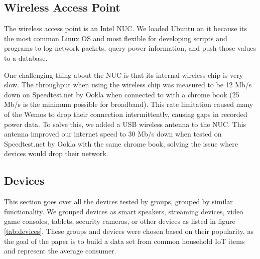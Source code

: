 \subsection{Wireless Access Point}
\label{Wireless Access Point}
The wireless access point is an Intel NUC. We loaded Ubuntu on it because its the most common Linux OS and most flexible for developing scripts and programs to log network packets, query power information, and push those values to a database.

One challenging thing about the NUC is that its internal wireless chip is very slow. The throughput when using the wireless chip was measured to be 12 Mb/s down on Speedtest.net by Ookla when connected to with a chrome book (25 Mb/s is the minimum possible for broadband). This rate limitation caused many of the Wemos to drop their connection intermittently, causing gaps in recorded power data. To solve this, we added a USB wireless antenna to the NUC. This antenna improved our internet speed to 30 Mb/s down when tested on Speedtest.net by Ookla with the same chrome book, solving the issue where devices would drop their network.

\subsection{Devices}
\label{Devices}
This section goes over all the devices tested by groups, grouped by similar functionality. We grouped devices as smart speakers, streaming devices, video game consoles, tablets, security cameras, or other devices as listed in figure \ref{tab:devices}. These groups and devices were chosen based on their popularity, as the goal of the paper is to build a data set from common household IoT items and represent the average consumer.

